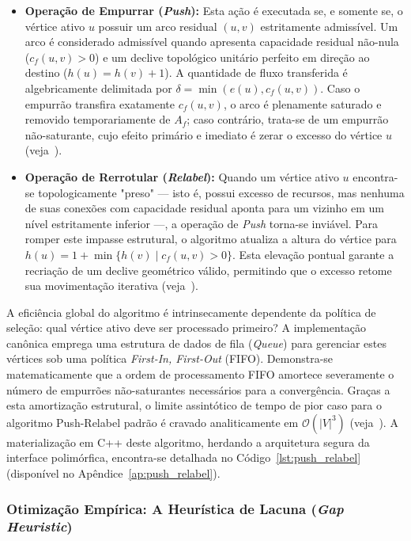 \documentclass[12pt,a4paper]{article}
\begin{document}
\begin{itemize}
    \item \textbf{Operação de Empurrar (\textit{Push}):} Esta ação é executada se, e somente se, o vértice ativo $u$ possuir um arco residual $(u,v)$ estritamente admissível. Um arco é considerado admissível quando apresenta capacidade residual não-nula ($c_f(u,v) > 0$) e um declive topológico unitário perfeito em direção ao destino ($h(u) = h(v) + 1$). A quantidade de fluxo transferida é algebricamente delimitada por $\delta = \min(e(u), c_f(u,v))$. Caso o empurrão transfira exatamente $c_f(u,v)$, o arco é plenamente saturado e removido temporariamente de $A_f$; caso contrário, trata-se de um empurrão não-saturante, cujo efeito primário e imediato é zerar o excesso do vértice $u$ (veja~\cite{cook1998combinatorial}).

    \item \textbf{Operação de Rerrotular (\textit{Relabel}):} Quando um vértice ativo $u$ encontra-se topologicamente "preso" — isto é, possui excesso de recursos, mas nenhuma de suas conexões com capacidade residual aponta para um vizinho em um nível estritamente inferior —, a operação de \textit{Push} torna-se inviável. Para romper este impasse estrutural, o algoritmo atualiza a altura do vértice para $h(u) = 1 + \min \{h(v) \mid c_f(u,v) > 0\}$. Esta elevação pontual garante a recriação de um declive geométrico válido, permitindo que o excesso retome sua movimentação iterativa (veja~\cite{korte2018combinatorial}).
\end{itemize}

A eficiência global do algoritmo é intrinsecamente dependente da política de seleção: qual vértice ativo deve ser processado primeiro? A implementação canônica emprega uma estrutura de dados de fila (\textit{Queue}) para gerenciar estes vértices sob uma política \textit{First-In, First-Out} (FIFO). Demonstra-se matematicamente que a ordem de processamento FIFO amortece severamente o número de empurrões não-saturantes necessários para a convergência. Graças a esta amortização estrutural, o limite assintótico de tempo de pior caso para o algoritmo Push-Relabel padrão é cravado analiticamente em $\mathcal{O}(|V|^3)$ (veja~\cite{goldberg1988new}). A materialização em C++ deste algoritmo, herdando a arquitetura segura da interface polimórfica, encontra-se detalhada no Código~\ref{lst:push_relabel} (disponível no Apêndice~\ref{ap:push_relabel}).

\subsubsection{Otimização Empírica: A Heurística de Lacuna (\textit{Gap Heuristic})}
\end{document}
